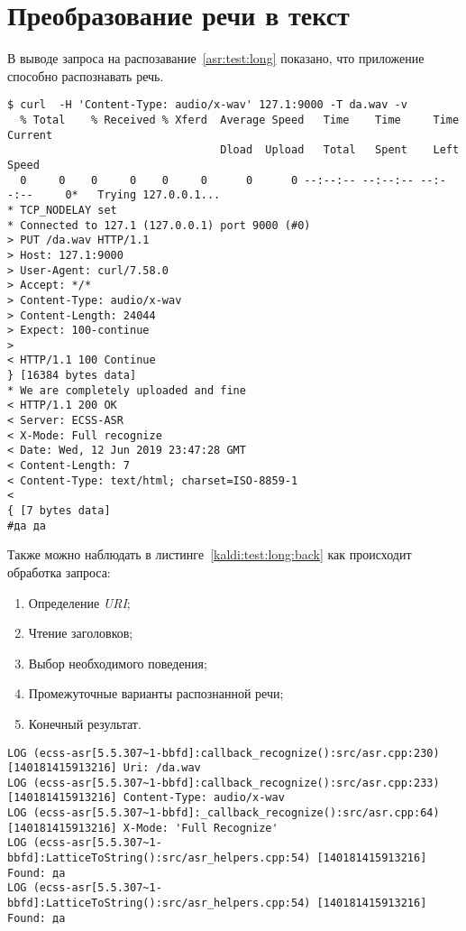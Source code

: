 \section{Преобразование речи в текст}
В выводе запроса на распозавание~\ref{asr:test:long} показано, что приложение
способно распознавать речь.

\begin{lstlisting}[caption={Преобразование речи в текст со стороны клиента}, label={asr:test:long}]
$ curl  -H 'Content-Type: audio/x-wav' 127.1:9000 -T da.wav -v
  % Total    % Received % Xferd  Average Speed   Time    Time     Time  Current
                                 Dload  Upload   Total   Spent    Left  Speed
  0     0    0     0    0     0      0      0 --:--:-- --:--:-- --:--:--     0*   Trying 127.0.0.1...
* TCP_NODELAY set
* Connected to 127.1 (127.0.0.1) port 9000 (#0)
> PUT /da.wav HTTP/1.1
> Host: 127.1:9000
> User-Agent: curl/7.58.0
> Accept: */*
> Content-Type: audio/x-wav
> Content-Length: 24044
> Expect: 100-continue
>
< HTTP/1.1 100 Continue
} [16384 bytes data]
* We are completely uploaded and fine
< HTTP/1.1 200 OK
< Server: ECSS-ASR
< X-Mode: Full recognize
< Date: Wed, 12 Jun 2019 23:47:28 GMT
< Content-Length: 7
< Content-Type: text/html; charset=ISO-8859-1
<
{ [7 bytes data]
#да да
\end{lstlisting}

Также можно наблюдать в листинге~\ref{kaldi:test:long:back} как происходит обработка
запроса:
\begin{enumerate}
    \item Определение \textit{URI};
    \item Чтение заголовков;
    \item Выбор необходимого поведения;
    \item Промежуточные варианты распознанной речи;
    \item Конечный результат.
\end{enumerate}

\begin{lstlisting}[caption={Процесс ASR для преобразования речи в текст},label={kaldi:test:long:back}]
LOG (ecss-asr[5.5.307~1-bbfd]:callback_recognize():src/asr.cpp:230) [140181415913216] Uri: /da.wav
LOG (ecss-asr[5.5.307~1-bbfd]:callback_recognize():src/asr.cpp:233) [140181415913216] Content-Type: audio/x-wav
LOG (ecss-asr[5.5.307~1-bbfd]:_callback_recognize():src/asr.cpp:64) [140181415913216] X-Mode: 'Full Recognize'
LOG (ecss-asr[5.5.307~1-bbfd]:LatticeToString():src/asr_helpers.cpp:54) [140181415913216] Found: да
LOG (ecss-asr[5.5.307~1-bbfd]:LatticeToString():src/asr_helpers.cpp:54) [140181415913216] Found: да

\end{lstlisting}

